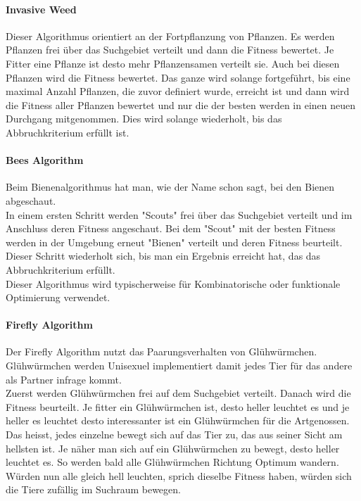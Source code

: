 		\paragraph{Invasive Weed}
		$\;$ \\
		Dieser Algorithmus orientiert an der Fortpflanzung von Pflanzen. Es werden Pflanzen frei über das Suchgebiet verteilt und dann die Fitness bewertet. Je Fitter eine Pflanze ist desto mehr Pflanzensamen verteilt sie. Auch bei diesen Pflanzen wird die Fitness bewertet. Das ganze wird solange fortgeführt, bis eine maximal Anzahl Pflanzen, die zuvor definiert wurde, erreicht ist und dann wird die Fitness aller Pflanzen bewertet und nur die der besten werden in einen neuen Durchgang mitgenommen. Dies wird solange wiederholt, bis das Abbruchkriterium erfüllt ist.
				
		
		\paragraph{Bees Algorithm}
		$\;$ \\
		Beim Bienenalgorithmus hat man, wie der Name schon sagt, bei den Bienen abgeschaut.\\
		In einem ersten Schritt werden "Scouts" frei über das Suchgebiet verteilt und im Anschluss deren Fitness angeschaut. Bei dem "Scout" mit der besten Fitness werden in der Umgebung erneut "Bienen" verteilt und deren Fitness beurteilt. Dieser Schritt wiederholt sich, bis man ein Ergebnis erreicht hat, das das Abbruchkriterium erfüllt.\\Dieser Algorithmus wird typischerweise für Kombinatorische oder funktionale Optimierung verwendet.
		
		\paragraph{Firefly Algorithm} 
		$\;$ \\
		Der Firefly Algorithm nutzt das Paarungsverhalten von Glühwürmchen. Glühwürmchen werden Unisexuel implementiert damit jedes Tier für das andere als Partner infrage kommt. \\
		Zuerst werden Glühwürmchen frei auf dem Suchgebiet verteilt. Danach wird die Fitness beurteilt. Je fitter ein Glühwürmchen ist, desto heller leuchtet es und je heller es leuchtet desto interessanter ist ein Glühwürmchen für die Artgenossen. Das heisst, jedes einzelne bewegt sich auf das Tier zu, das aus seiner Sicht am hellsten ist. Je näher man sich auf ein Glühwürmchen zu bewegt, desto heller leuchtet es. So werden bald alle Glühwürmchen Richtung Optimum wandern. Würden nun alle gleich hell leuchten, sprich dieselbe Fitness haben, würden sich die Tiere zufällig im Suchraum bewegen.
		
		